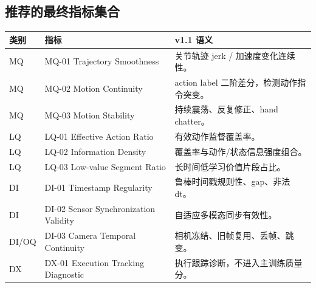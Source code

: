 \documentclass[UTF8,zihao=-4]{ctexart}
\begin{document}
\subsection*{推荐的最终指标集合}

\begin{center}
\small
\begin{tabularx}{\linewidth}{L{2.0cm} L{4.2cm} Y}
\toprule
类别 & 指标 & v1.1 语义 \\
\midrule
MQ & MQ-01 Trajectory Smoothness & 关节轨迹 jerk / 加速度变化连续性。 \\
MQ & MQ-02 Motion Continuity & action label 二阶差分，检测动作指令突变。 \\
MQ & MQ-03 Motion Stability & 持续震荡、反复修正、hand chatter。 \\
LQ & LQ-01 Effective Action Ratio & 有效动作监督覆盖率。 \\
LQ & LQ-02 Information Density & 覆盖率与动作/状态信息强度组合。 \\
LQ & LQ-03 Low-value Segment Ratio & 长时间低学习价值片段占比。 \\
DI & DI-01 Timestamp Regularity & 鲁棒时间戳规则性、gap、非法 dt。 \\
DI & DI-02 Sensor Synchronization Validity & 自适应多模态同步有效性。 \\
DI/OQ & DI-03 Camera Temporal Continuity & 相机冻结、旧帧复用、丢帧、跳变。 \\
DX & DX-01 Execution Tracking Diagnostic & 执行跟踪诊断，不进入主训练质量分。 \\
\bottomrule
\end{tabularx}
\end{center}
\end{document}
